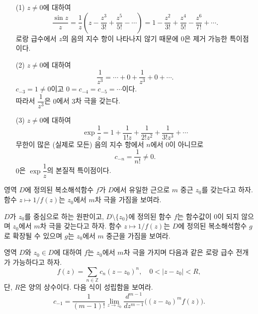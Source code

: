 \begin{saltexample}[label=example-4-16]{}{}

\begin{itemize}
\item[(1)] $z\ne0$에 대하여
\[
\dfrac{\sin z}z = \dfrac 1z\left( z - \dfrac{z^3}{3!} + \dfrac{z^5}{5!} - \cdots
\right) =1 - \dfrac{z^2}{3!} + \dfrac{z^4}{5!} - \dfrac{z^6}{7!} + \cdots.
\]
로랑 급수에서 $z$의 음의 지수 항이 나타나지 않기 때문에
$0$은 제거 가능한 특이점이다.
\item[(2)] $z\ne0$에 대하여 
\[
\dfrac1{z^3} = \cdots + 0 + \dfrac1{z^3} + 0 + \cdots.
\]
$c_{-3}=1 \ne 0$이고 $0=c_{-4} = c_{-5} = \cdots$이다. \\[1ex]
따라서 $\dfrac1{z^3}$은 $0$에서 $3$차 극을 갖는다.
\item[(3)] $z\ne0$에 대하여 
\[
\exp \dfrac1z = 1 + \dfrac1{1!z} + \dfrac1{2!z^2} + \dfrac1{3!z^3} + \cdots
\]
무한이 많은 (실제로 모든) 음의 지수 항에서 $n$에서 $0$이 아니므로
\[
c_{-n} = \dfrac1{n!} \ne 0.
\]
$0$은 $\exp \dfrac1z$의 본질적 특이점이다.
\end{itemize}
\end{saltexample}

\newpage %

\begin{salt_exercise}\label{ex-4-30}
영역 $D$에 정의된 복소해석함수 $f$가 $D$에서 유일한 근으로
$m$ 중근 $z_0$를 갖는다고 하자.
함수 $z\mapsto 1/f(z)$는 $z_0$에서 $m$차 극을 가짐을 보여라.
\end{salt_exercise}

\begin{salt_exercise}\label{ex-4-31}
$D$가 $z_0$를 중심으로 하는 원판이고, 
$D\setminus \{z_0\}$에 정의된 함수 $f$는 함수값이 $0$이 되지 않으며
$z_0$에서 $m$차 극을 갖는다고 하자. 
함수 $z\mapsto 1/f(z)$는 $D$에 정의된 복소해석함수 $g$로 확장될 수 있으며
$g$는 $z_0$에서 $m$ 중근을 가짐을 보여라.
\end{salt_exercise}

\begin{salt_exercise}\label{ex-4-32}
영역 $D$와  $z_0\in D$에 대하여
$f$는 $z_0$에서 $m$차 극을 가지며 다음과 같은 로랑 급수 전개가 가능하다고 하자.
\[
f(z) = \sum_{n\in\mathbb Z} c_n(z-z_0)^n,\quad
0<|z-z_0|<R,
\]
단, $R$은 양의 상수이다. 다음 식이 성립함을 보여라.
\[
c_{-1} = \dfrac1{(m-1)!}\lim_{z\to z_0} \dfrac{d^{m-1}}{dz^{m-1}}
\Big( (z-z_0)^m f(z) \Big).
\]
\end{salt_exercise}

